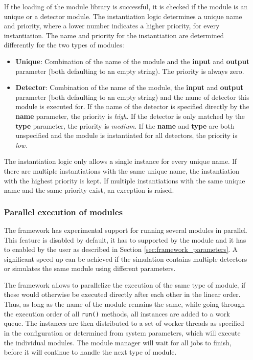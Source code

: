 If the loading of the module library is successful, it is checked if the module is an unique or a detector module.
The instantiation logic determines a unique name and priority, where a lower number indicates a higher priority, for every instantiation.
The name and priority for the instantiation are determined differently for the two types of modules:
\begin{itemize}
\item \textbf{Unique}: Combination of the name of the module and the \textbf{input} and \textbf{output} parameter (both defaulting to an empty string).
The priority is always zero.
\item \textbf{Detector}: Combination of the name of the module, the \textbf{input} and \textbf{output} parameter (both defaulting to an empty string) and the name of detector this module is executed for.
If the name of the detector is specified directly by the \textbf{name} parameter, the priority is \emph{high}.
If the detector is only matched by the \textbf{type} parameter, the priority is \emph{medium}.
If the \textbf{name} and \textbf{type} are both unspecified and the module is instantiated for all detectors, the priority is \emph{low}.
\end{itemize}
The instantiation logic only allows a single instance for every unique name.
If there are multiple instantiations with the same unique name, the instantiation with the highest priority is kept.
If multiple instantiations with the same unique name and the same priority exist, an exception is raised.

\subsubsection{Parallel execution of modules}
\label{sec:multithreading}
The framework has experimental support for running several modules in parallel.
This feature is disabled by default, it has to supported by the module and it has to enabled by the user as described in Section \ref{sec:framework_parameters}.
A significant speed up can be achieved if the simulation contains multiple detectors or simulates the same module using different parameters.

The framework allows to parallelize the execution of the same type of module, if these would otherwise be executed directly after each other in the linear order.
Thus, as long as the name of the module remains the same, while going through the execution order of all \texttt{run()} methods, all instances are added to a work queue.
The instances are then distributed to a set of worker threads as specified in the configuration or determined from system parameters, which will execute the individual modules.
The module manager will wait for all jobs to finish, before it will continue to handle the next type of module.

